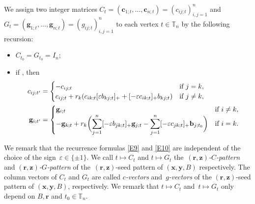 \documentclass[10pt,a4paper]{amsart}
\numberwithin{equation}{section}
\begin{document}
We assign two integer matrices $C_t=(\mathbf{c}_{1;t},\dots,\mathbf{c}_{n;t} )=(c_{ij;t})_{i,j=1}^n$ and $G_t=(\mathbf{g}_{1;t},\dots, \mathbf{g}_{n;t})=(g_{ij;t})_{i,j=1}^n$ to each vertex $t\in \mathbb{T}_n$ by the following recursion:
\begin{itemize}\itemsep=0pt
 \item $C_{t_0}=G_{t_0}=I_n$;
 \item if , then
 \begin{align}
 c_{ij:t'}&=
 \begin{cases}
 -c_{ij;t} & \text{if $j=k$},\\
 c_{ij;t}+r_k(c_{ik;t}[\varepsilon b_{kj;t}]_++[-\varepsilon c_{ik;t}]_+b_{kj;t})& \text{if $ j\neq k$},
 \end{cases}\label{E9}\\
 \mathbf{g}_{i;t'}&=
 \begin{cases}
 \mathbf{g}_{i;t} & \text{if $i\neq k$},\\
 \displaystyle-\mathbf{g}_{k;t}+r_k\biggl(\sum\limits_{j=1}^{n}[-\varepsilon b_{jk;t}]_+\mathbf{g}_{j;t}-\sum\limits_{j=1}^{n}[-\varepsilon c_{jk;t}]_+\mathbf{b}_{j;t_0}\biggr) & \text{if $i=k$}.
 \end{cases}\label{E10}
 \end{align}
\end{itemize}
We remark that the recurrence formulas \eqref{E9} and \eqref{E10} are independent of the choice of the sign~${\varepsilon\in \{\pm 1\}}$.
We call $t\mapsto C_t$ and $t\mapsto G_t$ the~{\it $(\mathbf{r},\mathbf{z})$-$C$-pattern} and {\it $(\mathbf{r},\mathbf{z})$-$G$-pattern} of the~$(\mathbf{r},\mathbf{z})$-seed pattern of $(\mathbf{x},\mathbf{y}, B)$ respectively.
The column vectors of $C_t$ and $G_t$ are called {\it $c$-vectors} and~{\it $g$-vectors} of the $(\mathbf{r},\mathbf{z})$-seed pattern of $(\mathbf{x},\mathbf{y}, B)$, respectively. We remark that $t\mapsto C_t$ and~${t\mapsto G_t}$ only depend on $B, \mathbf{r}$ and $t_0\in \mathbb{T}_n$.
\end{document}
